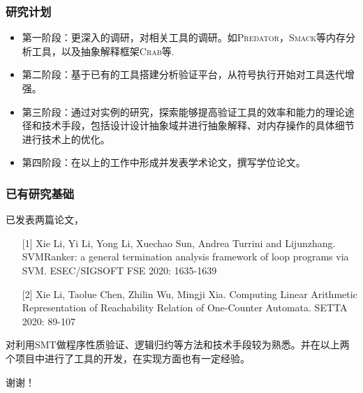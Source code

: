 \documentclass[aspectratio=1610, 11pt]{beamer}
\begin{document}
\begin{frame}\frametitle{研究计划}
\begin{itemize}
\item 第一阶段：更深入的调研，对相关工具的调研。如\textsc{Predator}，\textsc{Smack}等内存分析工具，以及抽象解释框架\textsc{Crab}等.

\item 第二阶段：基于已有的工具搭建分析验证平台，从符号执行开始对工具迭代增强。

\item 第三阶段：通过对实例的研究，探索能够提高验证工具的效率和能力的理论途径和技术手段，包括设计设计抽象域并进行抽象解释、对内存操作的具体细节进行技术上的优化。

\item 第四阶段：在以上的工作中形成并发表学术论文，撰写学位论文。
\end{itemize}
\end{frame}

\begin{frame}\frametitle{已有研究基础}
已发表两篇论文，
\begin{itemize}
\item [{[1]}] Xie Li, Yi Li, Yong Li, Xuechao Sun, Andrea Turrini and Lijunzhang. SVMRanker: a general termination analysis framework of loop programs via SVM. ESEC/SIGSOFT FSE 2020: 1635-1639
\item [{[2]}] Xie Li, Taolue Chen, Zhilin Wu, Mingji Xia. Computing Linear Arithmetic Representation of Reachability Relation of One-Counter Automata. SETTA 2020: 89-107
\end{itemize}

对利用SMT做程序性质验证、逻辑归约等方法和技术手段较为熟悉。并在以上两个项目中进行了工具的开发，在实现方面也有一定经验。
\end{frame}

\begin{frame}
\begin{center}
\large
谢谢！
\end{center}

\end{frame}
\end{document}

